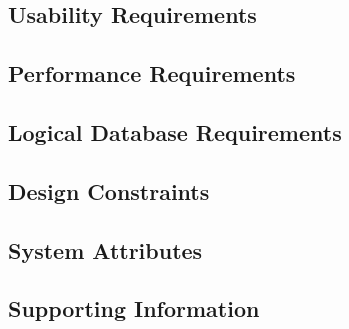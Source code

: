 \subsection{Usability Requirements}

\subsection{Performance Requirements}

\subsection{Logical Database Requirements}

\subsection{Design Constraints}

\subsection{System Attributes}

\subsection{Supporting Information}

